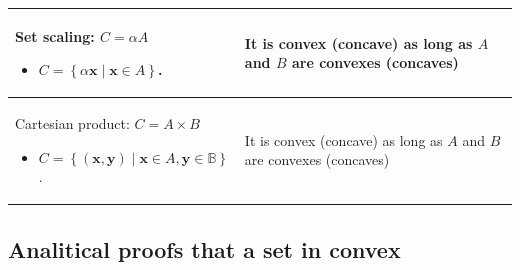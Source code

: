 \documentclass{article}
\begin{document}
\begin{xltabular}[l]{0.5\linewidth}{|X|X|}
    \hline
    Set scaling: $C = \alpha A$
    \begin{itemize}[leftmargin=*]
        \item \(C = \left\{ \alpha \mathbf{x} \mid \mathbf{x} \in A \right\}\).
    \end{itemize} & It is convex (concave) as long as \(A\) and \(B\) are convexes (concaves)\\
    \hline
    Cartesian product: $C = A \times B $
    \begin{itemize}[leftmargin=*]
        \item \(C = \left\{ (\mathbf{x}, \mathbf{y}) \mid \mathbf{x} \in A, \mathbf{y} \in \mathbb{B} \right\}\).
    \end{itemize} & It is convex (concave) as long as \(A\) and \(B\) are convexes (concaves)\\
    \hline
\end{xltabular}

\subsection{Analitical proofs that a set in convex}
\end{document}
